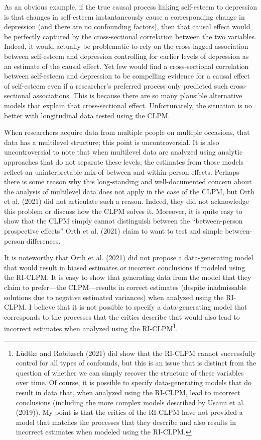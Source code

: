 \documentclass[
  english,
  man,floatsintext]{apa6}
\begin{document}
As an obvious example, if the true causal process linking self-esteem to depression is that changes in self-esteem instantaneously cause a corresponding change in depression (and there are no confounding factors), then that causal effect would be perfectly captured by the cross-sectional correlation between the two variables. Indeed, it would actually be problematic to rely on the cross-lagged association between self-esteem and depression controlling for earlier levels of depression as an estimate of the causal effect. Yet few would find a cross-sectional correlation between self-esteem and depression to be compelling evidence for a causal effect of self-esteem even if a researcher's preferred process only predicted such cross-sectional associations. This is because there are so many plausible alternative models that explain that cross-sectional effect. Unfortunately, the situation is no better with longitudinal data tested using the CLPM.

When researchers acquire data from multiple people on multiple occasions, that data has a multilevel structure; this point is uncontroversial. It is also uncontroversial to note that when multilevel data are analyzed using analytic approaches that do not separate these levels, the estimates from those models reflect an uninterpretable mix of between and within-person effects. Perhaps there is some reason why this long-standing and well-documented concern about the analysis of multilevel data does not apply in the case of the CLPM, but Orth et al. (2021) did not articulate such a reason. Indeed, they did not acknowledge this problem or discuss how the CLPM solves it. Moreover, it is quite easy to show that the CLPM simply cannot distinguish between the ``between-person prospective effects'' Orth et al. (2021) claim to want to test and simple between-person differences.

It is noteworthy that Orth et al. (2021) did not propose a data-generating model that would result in biased estimates or incorrect conclusions if modeled using the RI-CLPM. It is easy to show that generating data from the model that they claim to prefer---the CLPM---results in correct estimates (despite inadmissable solutions due to negative estimated variances) when analyzed using the RI-CLPM. I believe that it is not possible to specify a data-generating model that corresponds to the processes that the critics describe that would also lead to incorrect estimates when analyzed using the RI-CLPM\footnote{Lüdtke and Robitzsch (2021) did show that the RI-CLPM cannot successfully control for all types of confounds, but this is an issue that is distinct from the question of whether we can simply recover the structure of these variables over time. Of course, it is possible to specify data-generating models that do result in data that, when analyzed using the RI-CLPM, lead to incorrect conclusions (including the more complex models described by Usami et al. (2019)). My point is that the critics of the RI-CLPM have not provided a model that matches the processes that they describe and also results in incorrect estimates when modeled using the RI-CLPM.}.
\end{document}
